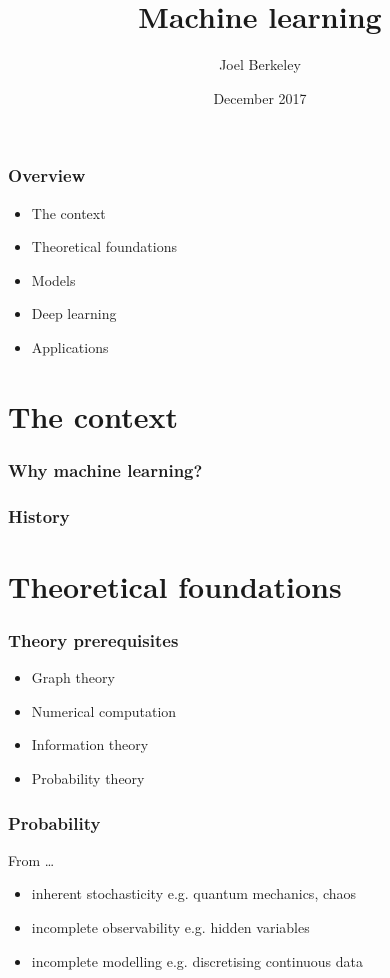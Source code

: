 \documentclass[xcolor={dvipsnames}]{beamer}
\author{Joel Berkeley}
\title{Machine learning}
\institute{Verimatrix Bristol}
\date{December 2017}
\begin{document}
\begin{frame}
  \maketitle
\end{frame}

\begin{frame}
  \frametitle{Overview}
  \begin{itemize}
    \item<+-> The context
    \item<+-> Theoretical foundations
    \item<+-> Models
    \item<+-> Deep learning
    \item<+-> Applications
  \end{itemize}
\end{frame}

\section{The context}

\begin{frame}
  \frametitle{Why machine learning?}
\end{frame}

\begin{frame}
  \frametitle{History}
\end{frame}

\section{Theoretical foundations}

\begin{frame}
  \frametitle{Theory prerequisites}
  \begin{itemize}
    \item<+-> Graph theory
    \item<+-> Numerical computation
    \item<+-> Information theory
    \item<+-> Probability theory
  \end{itemize}
\end{frame}

\begin{frame}
  \frametitle{Probability}
  From \ldots\
  \begin{itemize}
    \item<+-> inherent stochasticity e.g. quantum mechanics, chaos
    \item<+-> incomplete observability e.g. hidden variables
    \item<+-> incomplete modelling e.g. discretising continuous data
  \end{itemize}
\end{frame}
\end{document}
